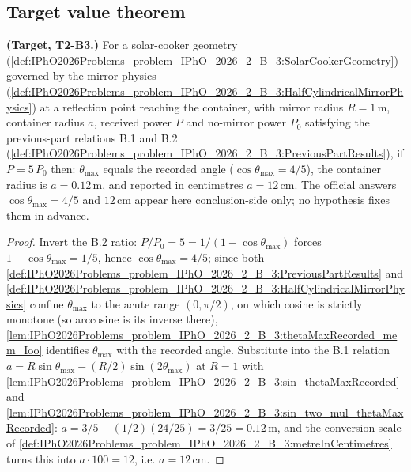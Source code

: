 \subsection*{Target value theorem}

\begin{theorem}
\label{thm:IPhO2026Problems_problem_IPhO_2026_2_B_3:container_diameter_for_quintuple_power}
\textbf{(Target, T2-B3.)}  For a solar-cooker geometry
(\cref{def:IPhO2026Problems_problem_IPhO_2026_2_B_3:SolarCookerGeometry})
governed by the mirror physics
(\cref{def:IPhO2026Problems_problem_IPhO_2026_2_B_3:HalfCylindricalMirrorPhysics})
at a reflection point reaching the container, with mirror radius
$R = 1\,\mathrm{m}$, container radius $a$, received power $P$ and no-mirror
power $P_0$ satisfying the previous-part relations B.1 and B.2
(\cref{def:IPhO2026Problems_problem_IPhO_2026_2_B_3:PreviousPartResults}),
if $P = 5\,P_0$ then: $\theta_{\max}$ equals the recorded angle
($\cos\theta_{\max} = 4/5$), the container radius is
$a = 0.12\,\mathrm{m}$, and reported in centimetres $a = 12\,\mathrm{cm}$.
The official answers $\cos\theta_{\max} = 4/5$ and $12\,\mathrm{cm}$ appear
here conclusion-side only; no hypothesis fixes them in advance.
\end{theorem}
\begin{proof}
Invert the B.2 ratio: $P/P_0 = 5 = 1/(1-\cos\theta_{\max})$ forces
$1-\cos\theta_{\max} = 1/5$, hence $\cos\theta_{\max} = 4/5$; since both
\cref{def:IPhO2026Problems_problem_IPhO_2026_2_B_3:PreviousPartResults} and
\cref{def:IPhO2026Problems_problem_IPhO_2026_2_B_3:HalfCylindricalMirrorPhysics}
confine $\theta_{\max}$ to the acute range $(0, \pi/2)$, on which cosine is
strictly monotone (so arccosine is its inverse there),
\cref{lem:IPhO2026Problems_problem_IPhO_2026_2_B_3:thetaMaxRecorded_mem_Ioo}
identifies $\theta_{\max}$ with the recorded angle.  Substitute into the B.1
relation $a = R\sin\theta_{\max} - (R/2)\sin(2\theta_{\max})$ at $R = 1$
with
\cref{lem:IPhO2026Problems_problem_IPhO_2026_2_B_3:sin_thetaMaxRecorded} and
\cref{lem:IPhO2026Problems_problem_IPhO_2026_2_B_3:sin_two_mul_thetaMaxRecorded}:
$a = 3/5 - (1/2)(24/25) = 3/25 = 0.12\,\mathrm{m}$, and the conversion scale
of
\cref{def:IPhO2026Problems_problem_IPhO_2026_2_B_3:metreInCentimetres} turns
this into $a \cdot 100 = 12$, i.e. $a = 12\,\mathrm{cm}$.
\end{proof}
